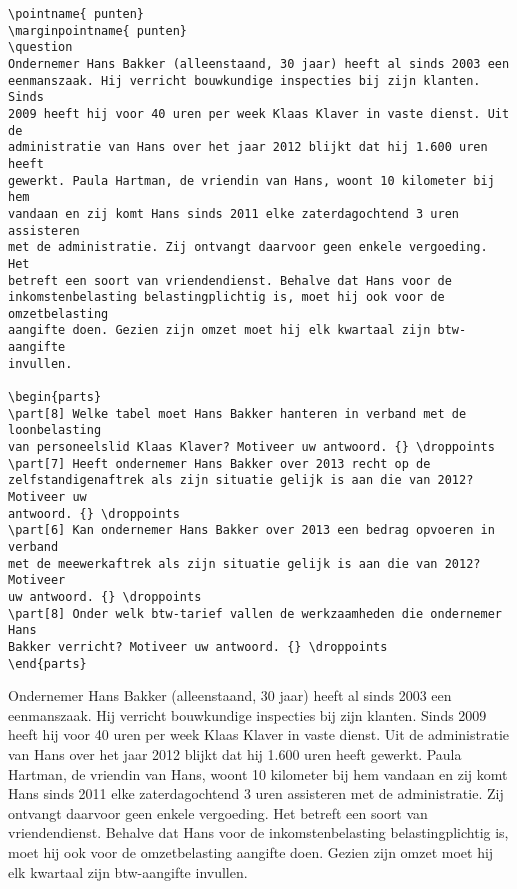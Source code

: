 \documentclass[12pt,dutch,addpoints,fleqn]{tisdexam}
\begin{document}
\begin{questions}
\begin{lstlisting}
\pointname{ punten}
\marginpointname{ punten}
\question
Ondernemer Hans Bakker (alleenstaand, 30 jaar) heeft al sinds 2003 een
eenmanszaak. Hij verricht bouwkundige inspecties bij zijn klanten. Sinds
2009 heeft hij voor 40 uren per week Klaas Klaver in vaste dienst. Uit de
administratie van Hans over het jaar 2012 blijkt dat hij 1.600 uren heeft
gewerkt. Paula Hartman, de vriendin van Hans, woont 10 kilometer bij hem
vandaan en zij komt Hans sinds 2011 elke zaterdagochtend 3 uren assisteren
met de administratie. Zij ontvangt daarvoor geen enkele vergoeding. Het
betreft een soort van vriendendienst. Behalve dat Hans voor de
inkomstenbelasting belastingplichtig is, moet hij ook voor de omzetbelasting
aangifte doen. Gezien zijn omzet moet hij elk kwartaal zijn btw-aangifte
invullen.

\begin{parts}
\part[8] Welke tabel moet Hans Bakker hanteren in verband met de loonbelasting
van personeelslid Klaas Klaver? Motiveer uw antwoord. {} \droppoints
\part[7] Heeft ondernemer Hans Bakker over 2013 recht op de
zelfstandigenaftrek als zijn situatie gelijk is aan die van 2012? Motiveer uw
antwoord. {} \droppoints
\part[6] Kan ondernemer Hans Bakker over 2013 een bedrag opvoeren in verband
met de meewerkaftrek als zijn situatie gelijk is aan die van 2012? Motiveer
uw antwoord. {} \droppoints
\part[8] Onder welk btw-tarief vallen de werkzaamheden die ondernemer Hans
Bakker verricht? Motiveer uw antwoord. {} \droppoints
\end{parts}
\end{lstlisting}

\question
Ondernemer Hans Bakker (alleenstaand, 30 jaar) heeft al sinds 2003 een
eenmanszaak. Hij verricht bouwkundige inspecties bij zijn klanten. Sinds
2009 heeft hij voor 40 uren per week Klaas Klaver in vaste dienst. Uit de
administratie van Hans over het jaar 2012 blijkt dat hij 1.600 uren heeft
gewerkt. Paula Hartman, de vriendin van Hans, woont 10 kilometer bij hem
vandaan en zij komt Hans sinds 2011 elke zaterdagochtend 3 uren assisteren
met de administratie. Zij ontvangt daarvoor geen enkele vergoeding. Het
betreft een soort van vriendendienst. Behalve dat Hans voor de
inkomstenbelasting belastingplichtig is, moet hij ook voor de omzetbelasting
aangifte doen. Gezien zijn omzet moet hij elk kwartaal zijn btw-aangifte
invullen.


\end{questions}
\end{document}
